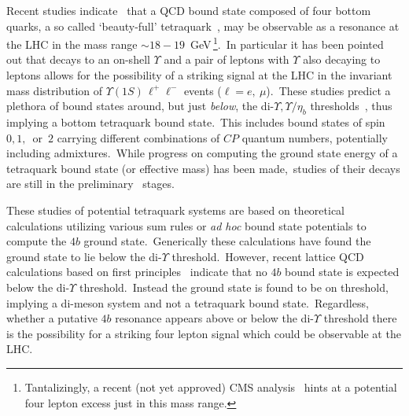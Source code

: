 \documentclass[nofootinbib,twocolumn,prl,preprintnumbers]{revtex4-1}
\begin{document}
Recent studies indicate~\cite{Berezhnoy:2011xn,Du:2012wp,Chen:2015moa,Karliner:2016zzc,Chen:2016jxd,Bai:2016int,Wu:2016vtq,Richard:2017vry,Wang:2017jtz,Eichten:2017ual} that a QCD bound state composed of four bottom quarks, a so called `beauty-full' tetraquark~\cite{Bai:2016int}, may be observable as a resonance at the LHC in the mass range $\sim 18-19$~GeV\,\footnote{Tantalizingly, a recent (not yet approved) CMS analysis~\cite{CMSpub} hints at a potential four lepton excess just in this mass range.}.~In particular it has been pointed out that decays to an on-shell $\Upsilon$ and a pair of leptons with $\Upsilon$ also decaying to leptons allows for the possibility of a striking signal at the LHC in the invariant mass distribution of $\Upsilon(1S) \,\ell^+\ell^-$ events ($\ell = e,~\mu$).~These studies predict a plethora of bound states around, but just \emph{below}, the di-$\Upsilon, \Upsilon/\eta_b$ thresholds~\cite{Chen:2016jxd}, thus implying a bottom tetraquark bound state.~This includes bound states of spin~$0,1,$~or~$2$ carrying different combinations of $CP$ quantum numbers, potentially including admixtures.~While progress on computing the ground state energy of a tetraquark bound state (or effective mass) has been made,~studies of their decays are still in the preliminary~\cite{Berezhnoy:2011xn,Chen:2016jxd,Karliner:2016zzc,Eichten:2017ual} stages.

These studies of potential tetraquark systems are based on theoretical calculations utilizing various sum rules or \emph{ad hoc} bound state potentials to compute the $4b$ ground state.~Generically these calculations have found the ground state to lie below the di-$\Upsilon$ threshold.~However, recent lattice QCD calculations based on first principles~\cite{Hughes:2017xie} indicate that no $4b$ bound state is expected below the di-$\Upsilon$ threshold.~Instead the ground state is found to be on threshold, implying a di-meson system and not a tetraquark bound state.~Regardless, whether a putative $4b$ resonance appears above or below the di-$\Upsilon$ threshold there is the possibility for a striking four lepton signal which could be observable at the LHC.
\end{document}

